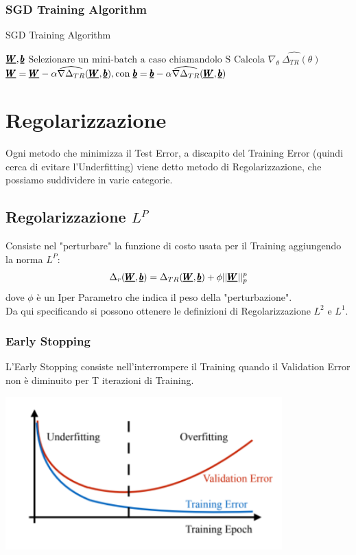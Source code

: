 \subsubsection{SGD Training Algorithm}
\begin{algorithm}
\caption{SGD Training Algorithm}
\begin{algorithmic}
 $\pmb{\underline{W}},\pmb{\underline{b}}$
\Repeat
\State $\text{Selezionare un mini-batch a caso chiamandolo S}$
\State $\text{Calcola } \widehat{\nabla_{\theta} \ \Delta_{TR}(\theta)} $
\State $\pmb{\underline{W}} = \pmb{\underline{W}} - \alpha \widehat{\nabla \Delta_{TR}}(\pmb{\underline{W}},\pmb{\underline{b}}), \text{con } \pmb{\underline{b}} = \pmb{\underline{b}} - \alpha \widehat{\nabla \Delta_{TR}}(\pmb{\underline{W}},\pmb{\underline{b}})$
\end{algorithmic}
\end{algorithm}


\section{Regolarizzazione}
Ogni metodo che minimizza il Test Error, a discapito del Training Error (quindi cerca di evitare l'Underfitting) viene detto metodo di Regolarizzazione, che possiamo suddividere in varie categorie.
\subsection{Regolarizzazione $L^P$}
Consiste nel "perturbare" la funzione di costo usata per il Training aggiungendo la norma $L^P$:
\begin{equation*}
    \Delta_r (\pmb{\underline{W}},\pmb{\underline{b}}) = \Delta_{TR}(\pmb{\underline{W}},\pmb{\underline{b}}) + \phi ||\pmb{\underline{W}}||_p^p
\end{equation*}
dove $\phi$ è un Iper Parametro che indica il peso della "perturbazione".\\

Da qui specificando si possono ottenere le definizioni di Regolarizzazione $L^2$ e $L^1$.
\subsubsection{Early Stopping}
L'Early Stopping consiste nell'interrompere il Training quando il Validation Error non è diminuito per T iterazioni di Training.

\includegraphics[width=0.8\textwidth]{Images/EarlyStopping.png}